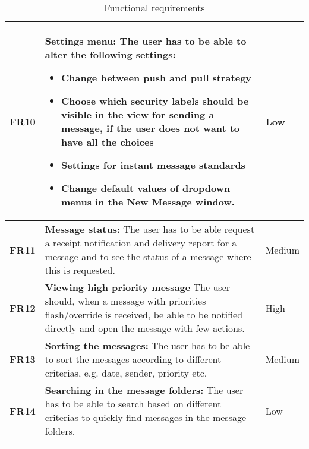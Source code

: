 \begin{longtable}{>{\setlength\hsize{.3\hsize}}X|>{\setlength\hsize{0.7\hsize}}X|>{\setlength\hsize{.3\hsize}}X}
\textbf{FR10} & \textbf{Settings menu:} The user has to be able to alter the following settings: 
\begin{itemize}
\item{}Change between push and pull strategy
\item{}Choose which security labels should be visible in the view for sending a message, if the user does not want to have all the choices
\item{}Settings for instant message standards
\item{}Change default values of dropdown menus in the New Message window.
\end{itemize}  & Low \\ \hline
\textbf{FR11} & \textbf{Message status:} The user has to be able request a receipt notification and delivery report for a message and to see the status of a message where this is requested.& Medium \\ \hline
\textbf{FR12} & \textbf{Viewing high priority message} The user should, when a message with priorities flash/override is received, be able to be notified directly and open the message with few actions. & High \\ \hline
\textbf{FR13} & \textbf{Sorting the messages:} The user has to be able to sort the messages according to different criterias, e.g. date, sender, priority etc. & Medium \\ \hline
\textbf{FR14} & \textbf{Searching in the message folders:} The user has to be able to search based on different criterias to quickly find messages in the message folders. & Low \\ \hline

\caption{Functional requirements} \label{tab:functionalrequirements}
\end{longtable}
